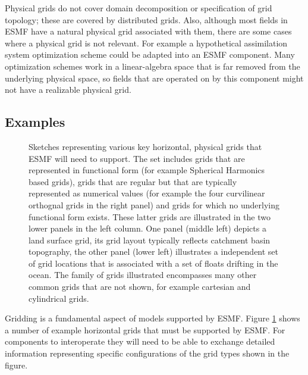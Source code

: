 Physical grids do not cover domain decomposition or specification of grid
topology; these are covered by distributed grids. Also, although most fields
in ESMF have a natural physical grid associated with them, there are
some cases where a physical grid is not relevant. For example
a hypothetical assimilation system optimization scheme could be adapted
into an ESMF component. Many optimization schemes work in a linear-algebra
space that is far removed from the underlying physical space, so fields
that are operated on by this component might not have a realizable
physical grid.

\subsection{Examples}


\begin{figure}
\caption{
Sketches representing various key horizontal, physical grids that ESMF will
need to support. The set includes grids that are represented
in functional form (for example Spherical Harmonics based
grids), grids that are regular but that are typically 
represented as numerical values (for example the four
curvilinear orthognal grids in the right panel) and grids for
which no underlying functional form exists. These latter
grids are illustrated in the two lower panels in the left column.
One panel (middle left) depicts a land surface grid, its
grid layout typically reflects catchment basin topography,
the other panel (lower left) illustrates a independent
set of grid locations that is associated with a set of 
floats drifting in the ocean. The family of grids illustrated
encompasses many other common grids that are not shown, for example
cartesian and cylindrical grids.
\label{fig:pg_reqdoc:hgridmontage}
}
\end{figure}

Gridding is a fundamental aspect of models supported by ESMF.
Figure \ref{fig:pg_reqdoc:hgridmontage} shows a number of example 
horizontal grids that must be supported by ESMF.
For components to interoperate they will need to be able to exchange detailed 
information representing specific configurations of the grid types
shown in the figure.
 
